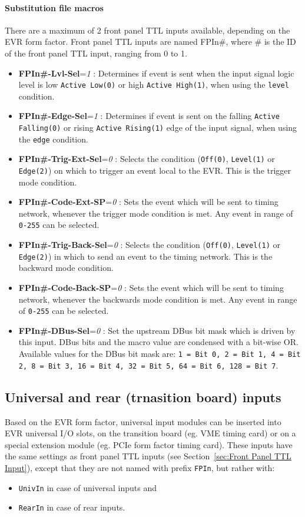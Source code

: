 \documentclass[12pt,a4paper]{article}
\begin{document}
\paragraph{Substitution file macros}
There are a maximum of 2 front panel TTL inputs available, depending on the EVR form factor. Front panel TTL inputs are named FPIn\#, where \# is the ID of the front panel TTL input, ranging from 0 to 1.
\begin{itemize}
  \item
    \textbf{FPIn\#-Lvl-Sel}=\emph{1} : Determines if event is sent when the input signal logic level is low \texttt{Active Low(0)} or high \texttt{Active High(1)}, when using the \texttt{level} condition.
  \item
    \textbf{FPIn\#-Edge-Sel}=\emph{1} : Determines if event is sent on the falling \texttt{Active Falling(0)} or rising \texttt{Active Rising(1)} edge of the input signal, when using the \texttt{edge} condition.
  \item
    \textbf{FPIn\#-Trig-Ext-Sel}=\emph{0} : Selects the condition (\texttt{Off(0)}, \texttt{Level(1)} or \texttt{Edge(2)}) on which to trigger an event local to the EVR. This is the trigger mode condition.
  \item
    \textbf{FPIn\#-Code-Ext-SP}=\emph{0} : Sets the event which will be sent to timing network, whenever the trigger mode condition is met. Any event in range of \texttt{0-255} can be selected.
  \item
    \textbf{FPIn\#-Trig-Back-Sel}=\emph{0} : Selects the condition (\texttt{Off(0)}, \texttt{Level(1)} or \texttt{Edge(2)}) in which to send an event to the timing network. This is the backward mode condition.
  \item
    \textbf{FPIn\#-Code-Back-SP}=\emph{0} : Sets the event which will be sent to timing network, whenever the backwards mode condition is met. Any event in range of \texttt{0-255} can be selected.
  \item
    \textbf{FPIn\#-DBus-Sel}=\emph{0} : Set the upstream DBus bit mask which is driven by this input. DBus bits and the macro value are condensed with a bit-wise OR. Available values for the DBus bit mask are: \texttt{1 = Bit 0, 2 = Bit 1, 4 = Bit 2, 8 = Bit 3, 16 = Bit 4, 32 = Bit 5, 64 = Bit 6, 128 = Bit 7}.
  \end{itemize}

\subsection{Universal and rear (trnasition board) inputs}
Based on the EVR form factor, universal input modules can be inserted into EVR universal I/O slots, on the transition board (eg. VME timing card) or on a special extension module (eg. PCIe form factor timing card). These inputs have the same settings as front panel TTL inputs (see Section~\ref{sec:Front Panel TTL Input}), except that they are not named with prefix \texttt{FPIn}, but rather with:
\begin{itemize}
\item \texttt{UnivIn} in case of universal inputs and
\item \texttt{RearIn} in case of rear inputs.
\end{itemize}
\end{document}
